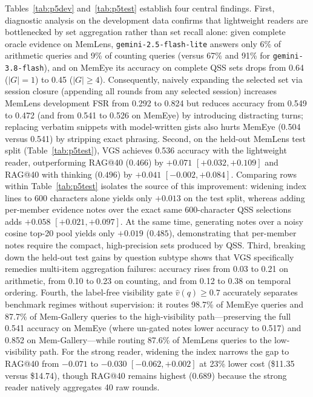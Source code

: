 \documentclass[10pt]{article}
\newcommand{\qss}{QSS}
\begin{document}
Tables~\ref{tab:p5dev} and~\ref{tab:p5test} establish four central findings. First, diagnostic analysis on the development data confirms that lightweight readers are bottlenecked by set aggregation rather than set recall alone: given complete oracle evidence on MemLens, \texttt{gemini-2.5-flash-lite} answers only 6\% of arithmetic queries and 9\% of counting queries (versus 67\% and 91\% for \texttt{gemini-3.8-flash}), and on MemEye its accuracy on complete \qss{} sets drops from 0.64 ($|G|{=}1$) to 0.45 ($|G|\ge 4$). Consequently, naively expanding the selected set via session closure (appending all rounds from any selected session) increases MemLens development FSR from 0.292 to 0.824 but reduces accuracy from 0.549 to 0.472 (and from 0.541 to 0.526 on MemEye) by introducing distracting turns; replacing verbatim snippets with model-written gists also hurts MemEye (0.504 versus 0.541) by stripping exact phrasing. Second, on the held-out MemLens test split (Table~\ref{tab:p5test}), VGS achieves 0.536 accuracy with the lightweight reader, outperforming RAG@40 ($0.466$) by $+0.071$ $[+0.032, +0.109]$ and RAG@40 with thinking ($0.496$) by $+0.041$ $[-0.002, +0.084]$. Comparing rows within Table~\ref{tab:p5test} isolates the source of this improvement: widening index lines to 600 characters alone yields only $+0.013$ on the test split, whereas adding per-member evidence notes over the exact same 600-character \qss{} selections adds $+0.058$ $[+0.021, +0.097]$. At the same time, generating notes over a noisy cosine top-20 pool yields only $+0.019$ ($0.485$), demonstrating that per-member notes require the compact, high-precision sets produced by \qss{}. Third, breaking down the held-out test gains by question subtype shows that VGS specifically remedies multi-item aggregation failures: accuracy rises from 0.03 to 0.21 on arithmetic, from 0.10 to 0.23 on counting, and from 0.12 to 0.38 on temporal ordering. Fourth, the label-free visibility gate $\hat{v}(q) \ge 0.7$ accurately separates benchmark regimes without supervision: it routes 98.7\% of MemEye queries and 87.7\% of Mem-Gallery queries to the high-visibility path—preserving the full 0.541 accuracy on MemEye (where un-gated notes lower accuracy to 0.517) and 0.852 on Mem-Gallery—while routing 87.6\% of MemLens queries to the low-visibility path. For the strong reader, widening the index narrows the gap to RAG@40 from $-0.071$ to $-0.030$ $[-0.062, +0.002]$ at 23\% lower cost (\$11.35 versus \$14.74), though RAG@40 remains highest ($0.689$) because the strong reader natively aggregates 40 raw rounds.
\end{document}
